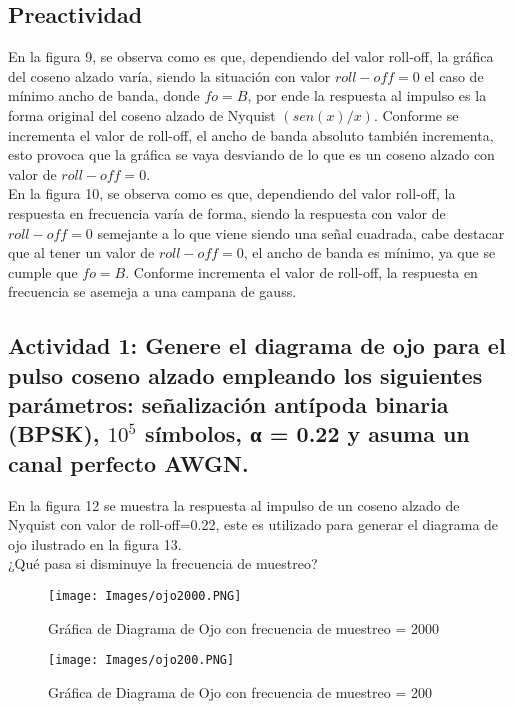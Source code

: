 \documentclass[lettersize,journal]{IEEEtran}
\begin{document}
\subsection{Preactividad}
\newline

En la figura 9, se observa como es que, dependiendo del valor roll-off, la gráfica del coseno alzado varía, siendo la situación con valor $roll-off=0$ el caso de mínimo ancho de banda, donde $fo=B$, por ende la respuesta al impulso es la forma original del coseno alzado de Nyquist $(sen(x)/x)$.
Conforme se incrementa el valor de roll-off, el ancho de banda absoluto también incrementa, esto provoca que la gráfica se vaya desviando de lo que es un coseno alzado con valor de $roll-off=0$.
\\
En la figura 10, se observa como es que, dependiendo del valor roll-off, la respuesta en frecuencia varía de forma, siendo la respuesta con valor de $roll-off=0$ semejante a lo que viene siendo una señal cuadrada, cabe destacar que al tener un valor de $roll-off=0$, el ancho de banda es mínimo, ya que se cumple que $fo=B$. Conforme incrementa el valor de roll-off, la respuesta en frecuencia se asemeja a una campana de gauss.\\

\subsection{Actividad 1: Genere el diagrama de ojo para el pulso coseno alzado empleando los siguientes parámetros: señalización antípoda binaria (BPSK), $10^5$ símbolos, α = 0.22 y
asuma un canal perfecto AWGN.}
\newline

En la figura 12 se muestra la respuesta al impulso de un coseno alzado de Nyquist con valor de roll-off=0.22, este es utilizado para generar el diagrama de ojo ilustrado en la figura 13.\\

¿Qué pasa si disminuye la frecuencia de muestreo?\\

\begin{figure}[h!]
    \centering
    \texttt{[image: Images/ojo2000.PNG]}
    \caption{Gráfica de Diagrama de Ojo con frecuencia de muestreo = 2000}
    \label{fig:my_label}
\end{figure}

\begin{figure}[h!]
    \centering
    \texttt{[image: Images/ojo200.PNG]}
    \caption{Gráfica de Diagrama de Ojo con frecuencia de muestreo = 200}
    \label{fig:my_label}
\end{figure}
\end{document}
